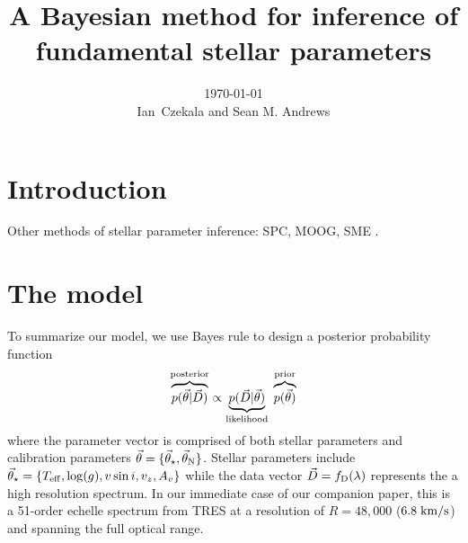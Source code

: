 \documentclass[preprint]{aastex} %
\newcommand{\vt}{\vec{\theta}}
\newcommand{\vstar}{\vt_{\star}}
\newcommand{\vN}{\vt_{\rm N}}
\newcommand{\fD}{f_{\rm D}}
\newcommand{\vD}{\vec{D}}
\begin{document}
\title{A Bayesian method for inference of fundamental stellar parameters}
\author{\today{}\\
\medskip
Ian~Czekala and Sean M. Andrews
}




\section{Introduction}

Other methods of stellar parameter inference: SPC\citep{blj+12}, MOOG, SME \citep{vp96}.

\section{The model}

To summarize our model, we use Bayes rule to design a posterior probability function
\begin{equation}
  \overbrace{p(\vt | \vD)}^{\rm posterior} \propto \underbrace{p(\vD | \vt)}_{\rm likelihood} \; \overbrace{p(\vt)}^{\rm prior}
  \label{eqn:posterior}
\end{equation}
where the parameter vector is comprised of both stellar parameters and calibration parameters $\vt = \{\vstar, \vN \}$. Stellar parameters include $\vstar = \{T_{\rm eff}, \log(g), v \sin i, v_z, A_v \}$ while the data vector $\vD = \fD(\lambda)$ represents the a high resolution spectrum. In our immediate case of our companion paper, this is a 51-order echelle spectrum from TRES at a resolution of $R=48,000$ ($6.8\;{\rm km/s}$) and spanning the full optical range.
\end{document}
